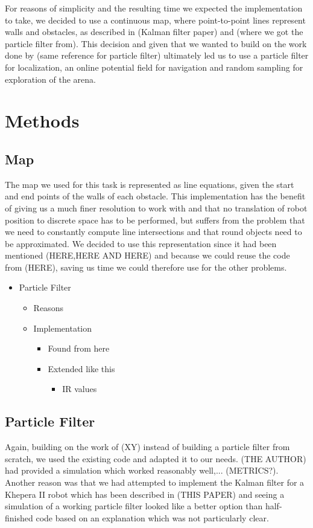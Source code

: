 \documentclass[paper=a4, fontsize=12pt]{scrartcl}	%
\numberwithin{equation}{section}		%
\numberwithin{figure}{section}			%
\numberwithin{table}{section}				%
\begin{document}
For reasons of simplicity and the resulting time we expected the implementation to take, we decided to use a continuous map, where point-to-point lines represent walls and obstacles, as described in (Kalman filter paper) and (where we got the particle filter from). This decision and given that we wanted to build on the work done by (same reference for particle filter) ultimately led us to use a particle filter for localization, an online potential field for navigation and random sampling for exploration of the arena.

\section{Methods} 
\subsection{Map}
The map we used for this task is represented as line equations, given the start and end points of the walls of each obstacle. This implementation has the benefit of giving us a much finer resolution to work with and that no translation of robot position to discrete space has to be performed, but suffers from the problem that we need to constantly compute line intersections and that round objects need to be approximated. We decided to use this representation since it had been mentioned (HERE,HERE AND HERE) and because we could reuse the code from (HERE), saving us time we could therefore use for the other problems.

\begin{itemize}
\item Particle Filter
\begin{itemize}
\item Reasons
\item Implementation
\begin{itemize}
\item Found from here
\item Extended like this
\begin{itemize}
\item IR values
\end{itemize}
\end{itemize}
\end{itemize}
\end{itemize}

\subsection{Particle Filter}
Again, building on the work of (XY) instead of building a particle filter from scratch, we used the existing code and adapted it to our needs. (THE AUTHOR) had provided a simulation which worked reasonably well,... (METRICS?). Another reason was that we had attempted to implement the Kalman filter for a Khepera II robot which has been described in (THIS PAPER) and seeing a simulation of a working particle filter looked like a better option than half-finished code based on an explanation which was not particularly clear.
\end{document}
